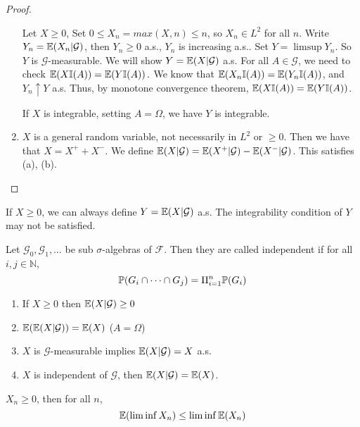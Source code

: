 \begin{proof}
\begin{enumerate}
  Let $X \geq 0$, Set $0 \leq X_{n} = max(X, n) \leq n$, so $X_{n} \in
  L^{2}$ for all $n$. Write $Y_{n} = \E{X_{n} | \mathcal{G}}$, then
  $Y_{n} \geq 0$ a.s., $Y_{n}$ is increasing a.s..  Set $Y = \limsup
  Y_{n}$.  So $Y$ is $\mathcal{G}$-measurable.  We will show $Y = \E{X
    | \mathcal{G}}$ a.s.  For all $A \in \mathcal{G}$, we need to
  check $\E{X \I{A}} = \E{Y \I{A}}.$ We know that
  $\E{X_{n} \I{A}} = \E{Y_{n} \I{A}}$, and $Y_{n}
  \uparrow Y$ a.s.  Thus, by monotone convergence theorem, $\E{X
    \I{A}} = \E{Y\I{A}}$.
  
  If $X$ is integrable, setting $A = \Omega$, we have $Y$ is
  integrable.
\item $X$ is a general random variable, not necessarily in $L^{2}$ or
  $\geq 0$.  Then we have that $X = X^{+} + X^{-}$.  We define $\E{X |
    \mathcal{G}} = \E{X^{+} | \mathcal{G}} - \E{X^{-} | \mathcal{G}}$.
  This satisfies (a), (b).
\end{enumerate}
\end{proof}

\begin{remark}
  If $X \geq 0$, we can always define $Y = \E{X | \mathcal{G}}$ a.s.
  The integrability condition of $Y$ may not be satisfied.
\end{remark}

\begin{defn}
  \label{defn:general:1}
  Let $\mathcal{G}_{0}, \mathcal{G}_{1}, \dots$ be sub $\sigma$-algebras of
  $\mathcal{F}$.  Then they are called independent if for all $i, j
  \in \mathbb{N}$,
  \begin{equation}
    \label{exmp:general:5}
    \Prob{G_i \cap \dots \cap G_j} = \Pi_{i = 1}^{n} \Prob{G_{i}}
  \end{equation}
\end{defn}

\begin{thm}
  \begin{enumerate}
  \item If $X \geq 0$ then $\E{X | \mathcal{G}} \geq 0$
  \item $\E{\E{X | \mathcal{G}}} = \E{X}$ ($A = \Omega$)
  \item $X$ is $\mathcal{G}$-measurable implies $\E{X | \mathcal{G}} = X$ a.s.
  \item $X$ is independent of $\mathcal{G}$, then $\E{X|\mathcal{G}} = \E{X}$.
  \end{enumerate}
\end{thm}

\begin{thm} $X_{n} \geq 0$, then for all $n$,
  \begin{equation}
    \label{exmp:general:6}
    \E{\liminf X_{n}} \leq \liminf \E{X_{n}}
  \end{equation}
\end{thm}

